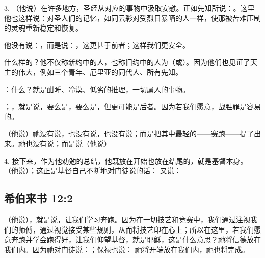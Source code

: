 3.  （他说）在许多地方，圣经从对应的事物中汲取安慰。正如先知所说：。这里他也这样说：对圣人们的记忆，如同云彩对受烈日暴晒的人一样，使那被苦难压制的灵魂重新稳定和恢复。\par

他没有说：，而是说：，这更甚于前者；这样我们更安全。\par

什么样的？他不仅称新约中的人，也称旧约中的人为（或）。因为他们也见证了天主的伟大，例如三个青年、厄里亚的同代人、所有先知。\par

 ：什么？就是酣睡、冷漠、低劣的推理，一切属人的事物。\par

；，就是说，要么是，要么是，但更可能是后者。因为若我们愿意，战胜罪是容易的。\par

（他说）祂没有说，也没有说，也没有说；而是把其中最轻的——赛跑——提了出来。祂也没有说；而是说（他说）\par

4. 接下来，作为他劝勉的总结，他既放在开始也放在结尾的，就是基督本身。 （他说）；这正是基督自己不断地对门徒说的话： 又说：\par


\subsection{希伯来书 12:2}

（他说），就是说，让我们学习奔跑。因为在一切技艺和竞赛中，我们通过注视我们的师傅，通过视觉接受某些规则，从而将技艺印在心上；所以在这里，若我们愿意奔跑并学会跑得好，让我们仰望基督，就是耶稣，这是什么意思？祂将信德放在我们内。因为祂对门徒说：；保禄也说： 祂将开端放在我们内，祂也将完成。\par

